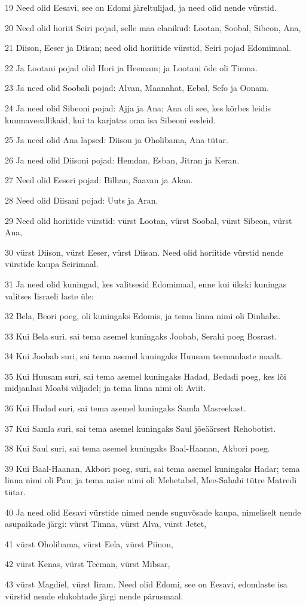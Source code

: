 \par 19 Need olid Eesavi, see on Edomi järeltulijad, ja need olid nende vürstid.
\par 20 Need olid horiit Seiri pojad, selle maa elanikud: Lootan, Soobal, Sibeon, Ana,
\par 21 Diison, Eeser ja Diisan; need olid horiitide vürstid, Seiri pojad Edomimaal.
\par 22 Ja Lootani pojad olid Hori ja Heemam; ja Lootani õde oli Timna.
\par 23 Ja need olid Soobali pojad: Alvan, Maanahat, Eebal, Sefo ja Oonam.
\par 24 Ja need olid Sibeoni pojad: Ajja ja Ana; Ana oli see, kes kõrbes leidis kuumaveeallikaid, kui ta karjatas oma isa Sibeoni eesleid.
\par 25 Ja need olid Ana lapsed: Diison ja Oholibama, Ana tütar.
\par 26 Ja need olid Diisoni pojad: Hemdan, Esban, Jitran ja Keran.
\par 27 Need olid Eeseri pojad: Bilhan, Saavan ja Akan.
\par 28 Need olid Diisani pojad: Uuts ja Aran.
\par 29 Need olid horiitide vürstid: vürst Lootan, vürst Soobal, vürst Sibeon, vürst Ana,
\par 30 vürst Diison, vürst Eeser, vürst Diisan. Need olid horiitide vürstid nende vürstide kaupa Seirimaal.
\par 31 Ja need olid kuningad, kes valitsesid Edomimaal, enne kui ükski kuningas valitses Iisraeli laste üle:
\par 32 Bela, Beori poeg, oli kuningaks Edomis, ja tema linna nimi oli Dinhaba.
\par 33 Kui Bela suri, sai tema asemel kuningaks Joobab, Serahi poeg Bosrast.
\par 34 Kui Joobab suri, sai tema asemel kuningaks Huusam teemanlaste maalt.
\par 35 Kui Huusam suri, sai tema asemel kuningaks Hadad, Bedadi poeg, kes lõi midjanlasi Moabi väljadel; ja tema linna nimi oli Aviit.
\par 36 Kui Hadad suri, sai tema asemel kuningaks Samla Masreekast.
\par 37 Kui Samla suri, sai tema asemel kuningaks Saul jõeäärsest Rehobotist.
\par 38 Kui Saul suri, sai tema asemel kuningaks Baal-Haanan, Akbori poeg.
\par 39 Kui Baal-Haanan, Akbori poeg, suri, sai tema asemel kuningaks Hadar; tema linna nimi oli Pau; ja tema naise nimi oli Mehetabel, Mee-Sahabi tütre Matredi tütar.
\par 40 Ja need olid Eesavi vürstide nimed nende suguvõsade kaupa, nimeliselt nende asupaikade järgi: vürst Timna, vürst Alva, vürst Jetet,
\par 41 vürst Oholibama, vürst Eela, vürst Piinon,
\par 42 vürst Kenas, vürst Teeman, vürst Mibsar,
\par 43 vürst Magdiel, vürst Iiram. Need olid Edomi, see on Eesavi, edomlaste isa vürstid nende elukohtade järgi nende pärusmaal.

